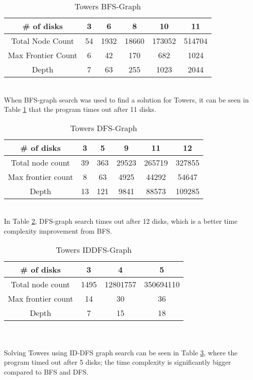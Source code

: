 \documentclass[11pt]{article}
\begin{document}
\begin{table}[htpb]
  \centering
  \caption{Towers BFS-Graph}
    \begin{tabular}{|c|c|c|c|c|c|}
    \hline
    \# of disks & \textbf{3} & \textbf{6} & \textbf{8} & \textbf{10} & \textbf{11} \\
    \hline
    Total Node Count & 54    & 1932  & 18660 & 173052 & 514704 \\
    Max Frontier Count & 6     & 42    & 170   & 682   & 1024 \\
    Depth & 7     & 63    & 255   & 1023  & 2044 \\
    \hline
    \end{tabular}%
  \label{bfs_tower}%
  \\
  \vspace*{5mm}
  When BFS-graph search was used to find a solution for Towers, it can be seen in Table \ref{bfs_tower} that the program times out after 11 disks.
\end{table}%

\begin{table}[htpb]
  \centering
  \caption{Towers DFS-Graph}
    \begin{tabular}{|c|c|c|c|c|c|}
    \hline
    \# of disks & \textbf{3} & \textbf{5} & \textbf{9} & \textbf{11} & \textbf{12} \\
    \hline
    Total node count & 39    & 363   & 29523 & 265719 & 327855 \\
    Max frontier count & 8     & 63    & 4925  & 44292 & 54647 \\
    Depth & 13    & 121   & 9841  & 88573 & 109285 \\
    \hline
    \end{tabular}%
  \label{tower_dfs}%
  \\
  \vspace*{5mm}
  In Table \ref{tower_dfs}, DFS-graph search times out after 12 disks, which is a better time complexity improvement from BFS.
\end{table}%

\begin{table}[htpb]
  \centering
  \caption{Towers IDDFS-Graph}
    \begin{tabular}{|c|c|c|c|}
    \hline
    \# of disks & \textbf{3} & \textbf{4} & \textbf{5} \\
    \hline
    Total node count & 1495  & 12801757 & 350694110 \\
    Max frontier count & 14    & 30    & 36 \\
    Depth & 7     & 15    & 18 \\
    \hline
    \end{tabular}%
  \label{tower_iddfs}%
  \\~\\
  \vspace*{5mm}
  Solving Towers using ID-DFS graph search can be seen in Table \ref{tower_iddfs}, where the program timed out after 5 disks; the time complexity is significantly bigger compared to BFS and DFS.
\end{table}%
\end{document}
